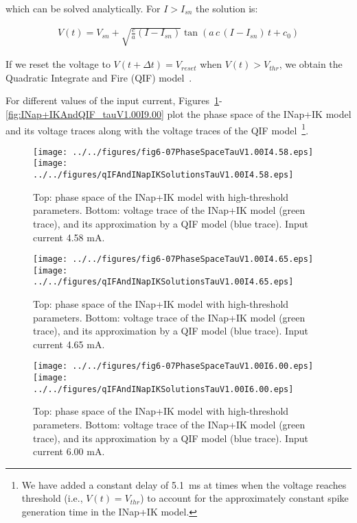 \documentclass{article}
\begin{document}
\noindent which can be solved analytically. For $I>I_{sn}$ the solution is:

\begin{eqnarray}
V(t)=V_{sn}+\sqrt{\frac{c}{a}(I-I_{sn})}\tan(a\,c\,(I-I_{sn})\,t+c_0)
\end{eqnarray}

If we reset the voltage to $V(t+\Delta t)=V_{reset}$ when $V(t)>V_{thr}$, we
obtain the Quadratic Integrate and Fire (QIF) model~\citep[][p.
80]{izhikevich07}.

For different values of the input current,
Figures~\ref{fig:INap+IKAndQIF_tauV1.00I4.58}-\ref{fig:INap+IKAndQIF_tauV1.00I9.00}
plot the phase space of the INap+IK model and its voltage traces along with
the voltage traces of the QIF model~\footnote{We have added a constant delay
of 5.1~ms at times when the voltage reaches threshold (i.e., $V(t)=V_{thr}$)
to account for the approximately constant spike generation time in the INap+IK
model.}.

\begin{figure}
\begin{center}
\texttt{[image: ../../figures/fig6-07PhaseSpaceTauV1.00I4.58.eps]}
\texttt{[image: ../../figures/qIFAndINapIKSolutionsTauV1.00I4.58.eps]}

\caption{Top: phase space of the INap+IK model with high-threshold parameters.
Bottom: voltage trace of the INap+IK model (green trace), and its
approximation by a QIF model (blue trace). Input current 4.58 mA.}

\label{fig:INap+IKAndQIF_tauV1.00I4.58}
\end{center}
\end{figure}

\begin{figure}
\begin{center}
\texttt{[image: ../../figures/fig6-07PhaseSpaceTauV1.00I4.65.eps]}
\texttt{[image: ../../figures/qIFAndINapIKSolutionsTauV1.00I4.65.eps]}

\caption{Top: phase space of the INap+IK model with high-threshold parameters.
Bottom: voltage trace of the INap+IK model (green trace), and its
approximation by a QIF model (blue trace). Input current 4.65 mA.}

\label{fig:INap+IKAndQIF_tauV1.00I4.65}
\end{center}
\end{figure}

\begin{figure}
\begin{center}
\texttt{[image: ../../figures/fig6-07PhaseSpaceTauV1.00I6.00.eps]}
\texttt{[image: ../../figures/qIFAndINapIKSolutionsTauV1.00I6.00.eps]}

\caption{Top: phase space of the INap+IK model with high-threshold parameters.
Bottom: voltage trace of the INap+IK model (green trace), and its
approximation by a QIF model (blue trace). Input current 6.00 mA.}

\label{fig:INap+IKAndQIF_tauV1.00I6.00}
\end{center}
\end{figure}
\end{document}
